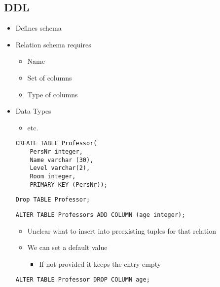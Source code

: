 \subsection{DDL}
\begin{itemize}
    \item Defines schema
    \item Relation schema requires
        \begin{itemize}
            \item Name
             \item Set of columns
             \item Type of columns
        \end{itemize}
    \item Data Types
        \begin{itemize}
             String of length $n$
                \begin{itemize}
                    \item Padded with whitespace to match length
                \end{itemize}
             String of length $\le n$
            \item etc.
        \end{itemize}

\begin{verbatim}
CREATE TABLE Professor(
    PersNr integer,
    Name varchar (30),
    Level varchar(2),
    Room integer,
    PRIMARY KEY (PersNr));
\end{verbatim}

\begin{verbatim}
Drop TABLE Professor;
\end{verbatim}

\begin{verbatim}
ALTER TABLE Professors ADD COLUMN (age integer);
\end{verbatim}
        \begin{itemize}
            \item Unclear what to insert into preexisting tuples for that relation
            \item We can set a default value
                \begin{itemize}
                    \item If not provided it keeps the entry empty
                \end{itemize}
        \end{itemize}

\begin{verbatim}
ALTER TABLE Professor DROP COLUMN age;
\end{verbatim}
\end{itemize}

